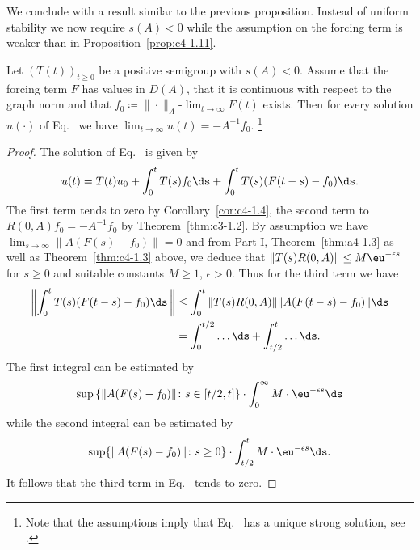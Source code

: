 We conclude with a result similar to the previous proposition.
Instead of uniform stability we now require $s(A) < 0$ while the assumption on the forcing term is weaker than in Proposition~\ref{prop:c4-1.11}.
\begin{proposition}\label{prop:c4-1.12}
Let $(T(t))_{t \geq 0}$ be a positive semigroup with $s(A) < 0$.
Assume that the forcing term $F$ has values in $D(A)$, that it is continuous with respect to the graph norm and that $f_{0} \coloneq  \|\cdot\|_{A}$-$\lim_{t \to \infty} F(t)$ exists.
Then for every solution $u(\cdot)$ of Eq.~ we have $\lim_{t \to \infty} u(t) = -A^{-1}f_{0}$.
\footnote{Note that the assumptions imply that Eq.~ has a unique strong solution, see \textcite[ Theorem~4.2.4]{pazy:1983}.}
\end{proposition}
\begin{proof}
The solution of Eq.~ is given by
\begin{equation}\label{eq:c4-1.8}
u(t) = T(t)u_{0} + \int_{0}^{t} T(s)f_{0} \ds + \int_{0}^{t} T(s)(F(t-s)-f_{0}) \ds .
\end{equation}
The first term tends to zero by Corollary~\ref{cor:c4-1.4},  
the second term to $R(0,A)f_{0} = -A^{-1}f_{0}$ by Theorem~\ref{thm:c3-1.2}.
By assumption we have $\lim_{s \to \infty}\|A(F(s)-f_{0})\| = 0$ and from Part-I,
Theorem~\ref{thm:a4-1.3} as well as Theorem~\ref{thm:c4-1.3} above, we deduce that $\|T(s)R(0,A)\| \leq M\eu^{-\epsilon s}$ for $s \geq 0$ and suitable constants $M \geq 1$, $\epsilon > 0$.
Thus for the third term we have
\begin{align*}
 \left\|\int_{0}^{t} T(s)(F(t-s)-f_{0}) \ds\,\right\| &\leq \int_{0}^{t} \|T(s)R(0,A)\| \|A(F(t-s)-f_{0})\| \ds \\
&= \int_{0}^{t/2} \ldots \ds + \int_{t/2}^{t} \ldots \ds.
\end{align*}
The first integral can be estimated by
\[
 \sup  \left\{\|A(F(s)-f_{0})\| \colon s \in 
 \left[ t/2 , t \right] \right\} 
\cdot \int_{0}^{\infty} M \cdot \eu^{-\epsilon s} \ds
\]
while the second integral can be estimated by 
\[
\sup\{\|A(F(s)-f_{0})\| \colon s \geq 0\}
\cdot \int_{t/2}^{t} M \cdot \eu^{- \epsilon s} \ds.
\]
It follows that the third term in Eq.~ tends to zero.
\end{proof}
\clearpage
